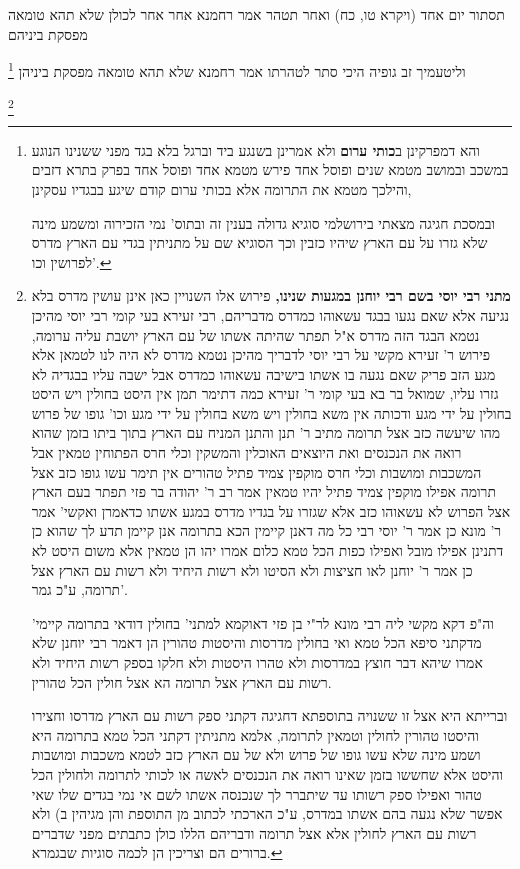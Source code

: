 \documentclass[12pt, openany]{book}
\newcommand{\footnotecomment}[1]{
	\renewcommand\thefootnote{}
	\footnote{#1}}
\newcommand{\commenta}[1]{\footnotecomment{#1}}
\begin{document}
{תסתור יום אחד (ויקרא טו, כח) ואחר תטהר אמר רחמנא אחר אחר לכולן שלא תהא טומאה מפסקת ביניהם 
\commenta{והא דמפרקינן ב\textbf{כותי ערום} ולא אמרינן בשנגע ביד וברגל בלא בגד מפני ששנינו הנוגע במשכב ובמושב מטמא שנים ופוסל אחד פירש מטמא אחד ופוסל אחד בפרק בתרא דזבים והילכך מטמא את התרומה אלא בכותי ערום קודם שיגע בבגדיו עסקינן,\par ובמסכת חגיגה מצאתי בירושלמי סוגיא גדולה בענין זה ובתוס' נמי הזכירוה ומשמע מינה שלא גזרו על עם הארץ שיהיו כזבין וכך הסוגיא שם על מתניתין בגדי עם הארץ מדרס לפרושין וכו'. }
וליטעמיך זב גופיה היכי סתר לטהרתו אמר רחמנא שלא תהא טומאה מפסקת ביניהן 
\commenta{\textbf{מתני רבי יוסי בשם רבי יוחנן במגעות שנינו,} פירוש אלו השנויין כאן אינן עושין מדרס בלא נגיעה אלא שאם נגעו בבגד עשאוהו כמדרס מדבריהם, רבי זעירא בעי קומי רבי יוסי מהיכן נטמא הבגד הזה מדרס א"ל תפתר שהיתה אשתו של עם הארץ יושבת עליה ערומה, פירוש ר' זעירא מקשי על רבי יוסי לדבריך מהיכן נטמא מדרס לא היה לנו לטמאן אלא מגע הזב פריק שאם נגעה בו אשתו בישיבה עשאוהו כמדרס אבל ישבה עליו בבגדיה לא גזרו עליו, שמואל בר בא בעי קומי ר' זעירא כמה דתימר תמן אין היסט בחולין ויש היסט בחולין על ידי מגע ודכותה אין משא בחולין ויש משא בחולין על ידי מגע וכו' גופו של פרוש מהו שיעשה כזב אצל תרומה מתיב ר' תנן והתנן המניח עם הארץ בתוך ביתו בזמן שהוא רואה את הנכנסים ואת היוצאים האוכלין והמשקין וכלי חרס הפתוחין טמאין אבל המשכבות ומושבות וכלי חרס מוקפין צמיד פתיל טהורים אין תימר עשו גופו כזב אצל תרומה אפילו מוקפין צמיד פתיל יהיו טמאין אמר רב ר' יהודה בר פזי תפתר בעם הארץ אצל הפרוש לא עשאוהו כזב אלא שגזרו על בגדיו מדרס במגע אשתו כדאמרן ואקשי' אמר ר' מונא כן אמר ר' יוסי רבי כל מה דאנן קיימין הכא בתרומה אנן קיימן תדע לך שהוא כן דתנינן אפילו מובל ואפילו כפות הכל טמא כלום אמרו יהו הן טמאין אלא משום היסט לא כן אמר ר' יוחנן לאו חציצות ולא הסיטו ולא רשות היחיד ולא רשות עם הארץ אצל תרומה, ע"כ גמר'.\par וה"פ דקא מקשי ליה רבי מונא לר"י בן פזי דאוקמא למתני' בחולין דודאי בתרומה קיימי' מדקתני סיפא הכל טמא ואי בחולין מדרסות והיסטות טהורין הן דאמר רבי יוחנן שלא אמרו שיהא דבר חוצץ במדרסות ולא טהרו היסטות ולא חלקו בספק רשות היחיד ולא רשות עם הארץ אצל תרומה הא אצל חולין הכל טהורין.\par וברייתא היא אצל זו ששנויה בתוספתא דחגיגה דקתני ספק רשות עם הארץ מדרסו וחצירו והיסטו טהורין לחולין וטמאין לתרומה, אלמא מתניתין דקתני הכל טמא בתרומה היא ושמע מינה שלא עשו גופו של פרוש ולא של עם הארץ כזב לטמא משכבות ומושבות והיסט אלא שחששו בזמן שאינו רואה את הנכנסים לאשה או לכותי לתרומה ולחולין הכל טהור ואפילו ספק רשותו עד שיתברר לך שנכנסה אשתו לשם אי נמי בגדים שלו שאי אפשר שלא נגעה בהם אשתו במדרס, ע"כ הארכתי לכתוב מן התוספת והן מגיהין ב) ולא רשות עם הארץ לחולין אלא אצל תרומה ודבריהם הללו כולן כתבתים מפני שדברים ברורים הם וצריכין הן לכמה סוגיות שבגמרא. }
}
\end{document}
